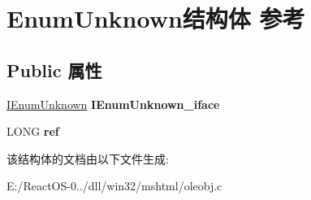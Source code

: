 \hypertarget{struct_enum_unknown}{}\section{Enum\+Unknown结构体 参考}
\label{struct_enum_unknown}
\subsection*{Public 属性}
\begin{DoxyCompactItemize}
\item 
\mbox{\label{struct_enum_unknown_a41431df6bef1fda6283d4722bdb6fcf4}} 
\hyperlink{interface_i_enum_unknown}{I\+Enum\+Unknown} {\bfseries I\+Enum\+Unknown\+\_\+iface}
\item 
\mbox{\label{struct_enum_unknown_afe1ab6a28c856a42511c5c409accd02a}} 
L\+O\+NG {\bfseries ref}
\end{DoxyCompactItemize}


该结构体的文档由以下文件生成\+:\begin{DoxyCompactItemize}
\item 
E\+:/\+React\+O\+S-\/0../dll/win32/mshtml/oleobj.\+c\end{DoxyCompactItemize}
